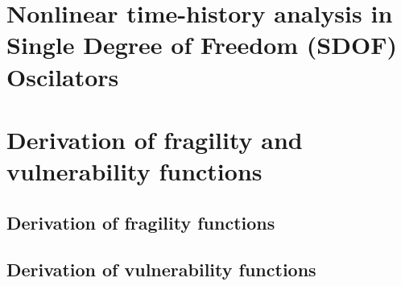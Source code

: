 	\section{Nonlinear time-history analysis in Single Degree of Freedom (SDOF) Oscilators}
	\label{subsec:NLTHA_SDOF}
	

	\section{Derivation of fragility and vulnerability functions}
	\label{sec:derive_fragility}
	

		\subsection{Derivation of fragility functions}
		\label{subsec:derive_fragility}
		

		\subsection{Derivation of vulnerability functions}
		\label{subsec:derive_vulnerability}
		